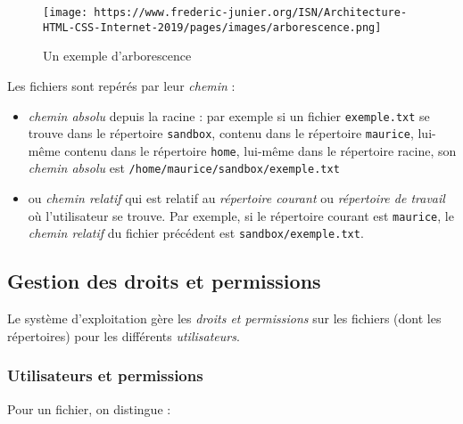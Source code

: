 \documentclass[
  11pt,
]{article}
\begin{document}
\begin{figure}
\centering
\texttt{[image: https://www.frederic-junier.org/ISN/Architecture-HTML-CSS-Internet-2019/pages/images/arborescence.png]}
\caption{Un exemple d'arborescence}
\end{figure}

Les fichiers sont repérés par leur \emph{chemin} :

\begin{itemize}
\item
  \emph{chemin absolu} depuis la racine : par exemple si un fichier
  \texttt{exemple.txt} se trouve dans le répertoire \texttt{sandbox},
  contenu dans le répertoire \texttt{maurice}, lui-même contenu dans le
  répertoire \texttt{home}, lui-même dans le répertoire racine, son
  \emph{chemin absolu} est \texttt{/home/maurice/sandbox/exemple.txt}
\item
  ou \emph{chemin relatif} qui est relatif au \emph{répertoire courant}
  ou \emph{répertoire de travail} où l'utilisateur se trouve. Par
  exemple, si le répertoire courant est \texttt{maurice}, le
  \emph{chemin relatif} du fichier précédent est
  \texttt{sandbox/exemple.txt}.
\end{itemize}

\hypertarget{gestion-des-droits-et-permissions}{%
\subsection{Gestion des droits et
permissions}\label{gestion-des-droits-et-permissions}}

Le système d'exploitation gère les \emph{droits et permissions} sur les
fichiers (dont les répertoires) pour les différents \emph{utilisateurs}.

\hypertarget{utilisateurs-et-permissions}{%
\subsubsection{Utilisateurs et
permissions}\label{utilisateurs-et-permissions}}

Pour un fichier, on distingue :
\end{document}
